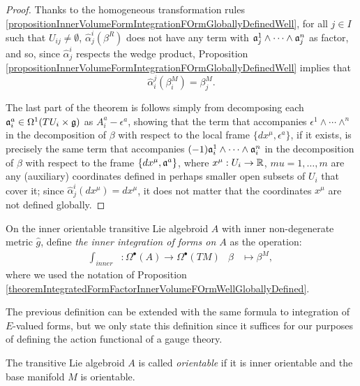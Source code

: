 \begin{proof}
Thanks to the homogeneous transformation rules \ref{propositionInnerVolumeFormIntegrationFOrmGloballyDefinedWell}, for all $j \in I$ such that $U_{ij} \neq \emptyset$, $\hat \alpha^i_j(\beta^R)$ does not have any term with $\mathfrak{a}_j^1 \wedge \cdots \wedge \mathfrak{a}_j^n$ as factor, and so, since $\hat \alpha^i_j$ respects the wedge product, Proposition \ref{propositionInnerVolumeFormIntegrationFOrmGloballyDefinedWell} implies that
\begin{equation}
    \hat \alpha^j_i(\beta^{M}_i) = \beta^{M}_j.
\end{equation}

The last part of the theorem is follows simply from decomposing each $\mathfrak{a}_i^a \in \Omega^1(TU_i \times \mathfrak{g})$ as $A_i^a - \epsilon^a$, showing that the term that accompanies $\epsilon^1 \wedge \cdots \wedge^n$ in the decomposition of $\beta$ with respect to the local frame $\{dx^\mu, \epsilon^a\}$, if it exists, is precisely the same term that accompanies $(-1)\mathfrak{a}_i^1 \wedge \cdots \wedge \mathfrak{a}_i^n$ in the decomposition of $\beta$ with respect to the frame $\{dx^\mu, \mathfrak{a}^a\}$, where $x^\mu: U_i\to \mathbb{R}$, $mu = 1, \dots , m$ are any (auxiliary) coordinates defined in perhaps smaller open subsets of $U_i$ that cover it; since $\hat \alpha^i_j(dx^\mu) = dx^\mu$, it does not matter that the coordinates $x^\mu$ are not defined globally.
\end{proof}


\begin{definition}\label{definitionInnerIntegration}
On the inner orientable transitive Lie algebroid $A$ with inner non-degenerate metric $\hat g$, define \emph{the inner integration of forms on $A$} as the operation:
\begin{align}
    \int_{inner} &: \Omega^\bullet(A) \to \Omega^\bullet(TM)
    & \beta &\mapsto \beta^M,
\end{align}
where we used the notation of Proposition \ref{theoremIntegratedFormFactorInnerVolumeFOrmWellGloballyDefined}.
\end{definition}
The previous definition can be extended with the same formula to integration of $E$-valued forms, but we only state this definition since it suffices for our purposes of defining the action functional of a gauge theory.

\begin{definition}
The transitive Lie algebroid $A$ is called \emph{orientable} if it is inner orientable and the base manifold $M$ is orientable.
\end{definition}

